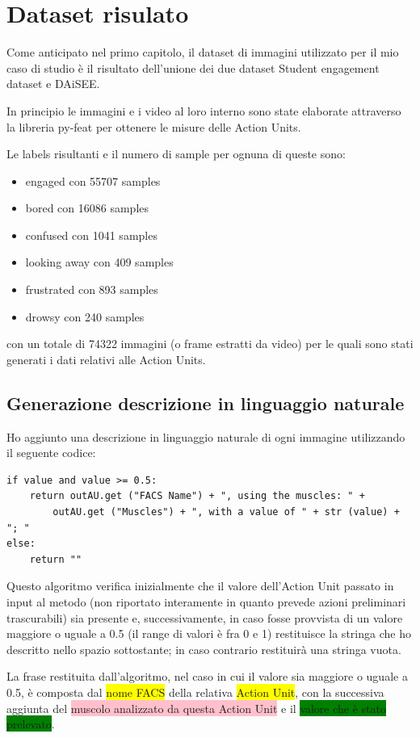 \chapter{Dataset risulato}
Come anticipato nel primo capitolo, il dataset di immagini utilizzato per il mio caso di studio è il risultato dell’unione dei due dataset Student engagement dataset\cite{StudEngagDataset} e DAiSEE\cite{DAiSEE}.

In principio le immagini e i video al loro interno sono state elaborate attraverso la libreria py-feat per ottenere le misure delle Action Units.

Le labels risultanti e il numero di sample per ognuna di queste sono:
\begin{itemize}
\item engaged con 55707 samples
\item bored con 16086 samples
\item confused con 1041 samples
\item looking away con 409 samples
\item frustrated con 893 samples
\item drowsy con 240 samples
\end{itemize}

con un totale di 74322 immagini (o frame estratti da video) per le quali sono stati generati i dati relativi alle Action Units.

\section{Generazione descrizione in linguaggio naturale}
Ho aggiunto una descrizione in linguaggio naturale di ogni immagine utilizzando il seguente codice:

\begin{verbatim}
if value and value >= 0.5:
    return outAU.get ("FACS Name") + ", using the muscles: " + 
        outAU.get ("Muscles") + ", with a value of " + str (value) + "; "
else:
    return ""
\end{verbatim}
Questo algoritmo verifica inizialmente che il valore dell’Action Unit passato in input al metodo (non riportato interamente in quanto prevede azioni preliminari trascurabili) sia presente e, successivamente, in caso fosse provvista di un valore maggiore o uguale a 0.5 (il range di valori è fra 0 e 1) restituisce la stringa che ho descritto nello spazio sottostante; in caso contrario restituirà una stringa vuota.

La frase restituita dall’algoritmo, nel caso in cui il valore sia maggiore o uguale a 0.5, è composta dal \colorbox{yellow}{nome FACS} della relativa \colorbox{yellow}{Action Unit}, con la successiva aggiunta del \colorbox{pink}{muscolo analizzato da questa Action Unit} e il \colorbox{green}{valore che è stato prelevato}.

